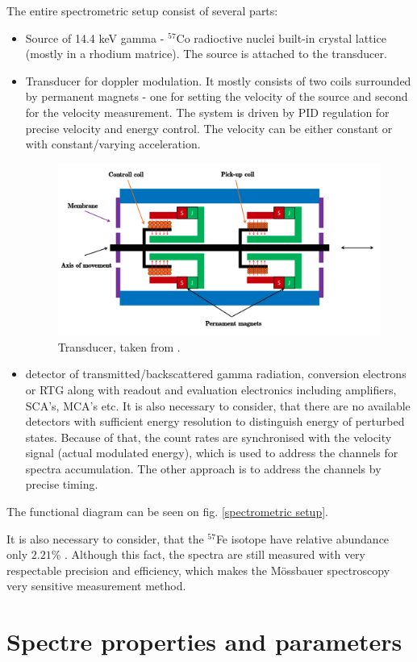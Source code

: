 The entire spectrometric setup consist of several parts:
\begin{itemize}

\item Source of 14.4 keV gamma - $^{57}$Co radioctive nuclei built-in crystal lattice (mostly in a rhodium matrice). The source is attached to the transducer.
\item Transducer for doppler modulation. It mostly consists of two coils surrounded by permanent magnets - one for setting the velocity of the source and second for the velocity measurement. The system is driven by PID regulation for precise velocity and energy control. The velocity can be either constant or with constant/varying acceleration.

\begin{figure}[H]
 \centering
 \includegraphics[scale=0.4, angle = 0]{./pictures/transducer}
 \caption{Transducer, taken from \cite{STEJSKAL2019thesis}.}
 \label{transducer}
 
\end{figure}

\item detector of transmitted/backscattered gamma radiation, conversion electrons or RTG along with readout and evaluation electronics including amplifiers, SCA's, MCA's etc. It is also necessary to consider, that there are no available detectors with sufficient energy resolution to distinguish energy of perturbed states. Because of that, the count rates are synchronised with the velocity signal (actual modulated energy), which is used to address the channels for spectra accumulation. The other approach is to address the channels by precise timing.

\end{itemize}
The functional diagram can be seen on fig. \ref{spectrometric setup}.

\par
It is also necessary to consider, that the $^{57}$Fe isotope have relative abundance only $2.21 \%$ \cite{compounds}. Although this fact, the spectra are still measured with very respectable precision and efficiency, which makes the Mössbauer spectroscopy very sensitive measurement method.

\section{Spectre properties and parameters}


